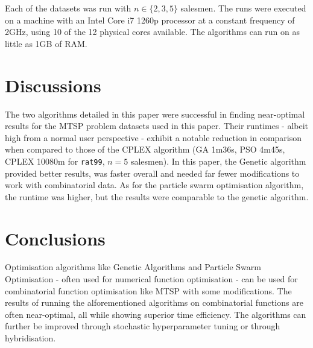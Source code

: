 \documentclass[conference]{IEEEtran}
\begin{document}
Each of the datasets was run with $n \in \{2, 3, 5\}$ salesmen. The runs were executed on a machine with an Intel Core i7
1260p processor at a constant frequency of 2GHz, using 10 of the 12 physical cores available. The algorithms can run on as
little as 1GB of RAM.


\section{Discussions}
The two algorithms detailed in this paper were successful in finding near-optimal results for the MTSP problem datasets used
in this paper. Their runtimes - albeit high from a normal user perspective - exhibit a notable reduction in comparison when
compared to those of the CPLEX algorithm (GA 1m36s, PSO 4m45s, CPLEX 10080m for \texttt{rat99}, $n = 5$ salesmen). In this paper,
the Genetic algorithm provided better results, was faster overall and needed far fewer modifications to work with combinatorial
data. As for the particle swarm optimisation algorithm, the runtime was higher, but the results were comparable to the genetic
algorithm.

\section{Conclusions}
Optimisation algorithms like Genetic Algorithms and Particle Swarm Optimisation - often used for numerical function optimisation -
can be used for combinatorial function optimisation like MTSP with some modifications. The results of running the alforementioned
algorithms on combinatorial functions are often near-optimal, all while showing superior time efficiency. The algorithms can
further be improved through stochastic hyperparameter tuning or through hybridisation.
\end{document}
